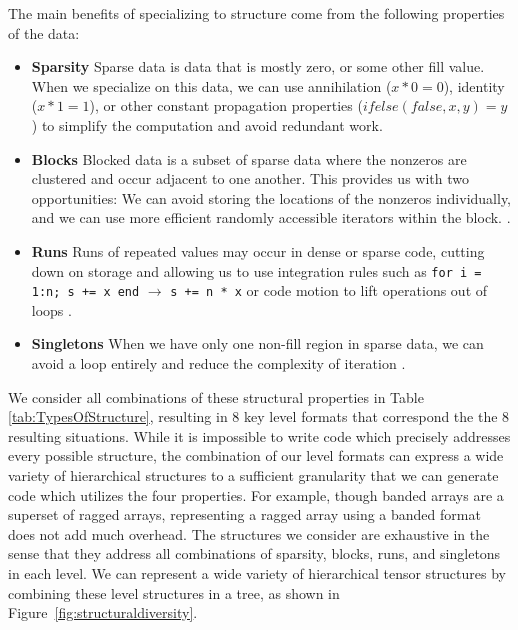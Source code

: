     The main benefits of specializing to structure come from the following properties of the data:
    \begin{itemize}
        \item \textbf{Sparsity} Sparse data is data that is mostly zero, or some other
        fill value. When we specialize on this data, we can use annihilation ($x
        * 0 = 0$), identity ($x * 1 = 1$), or other constant propagation
        properties ($ifelse(false, x, y) = y$) to simplify the computation and avoid
        redundant work.
        
        \item \textbf{Blocks} Blocked data is a subset of sparse data where the nonzeros
        are clustered and occur adjacent to one another. This provides us with
        two opportunities: We can avoid storing the locations of the nonzeros
        individually, and we can use more efficient randomly accessible
        iterators within the block. \cite{im_optimizing_2001, vuduc_performance_2002, ahrens_looplets_2023}.

        \item \textbf{Runs} Runs of repeated values may occur in dense or sparse code,
        cutting down on storage and allowing us to use integration rules such as 
        \texttt{for i = 1:n; s += x end} $\rightarrow$
        \texttt{s += n * x} or code motion to lift operations out of loops \cite{donenfeld_unified_2022,ahrens_looplets_2023}.

        \item \textbf{Singletons} When we have only one non-fill region in sparse data,
        we can avoid a loop entirely and reduce the complexity of iteration \cite{ghorbani2023compiling, ahrens_looplets_2023}.
    \end{itemize}

   We consider all combinations of these structural properties in Table
    \ref{tab:TypesOfStructure}, resulting in 8 key level formats that correspond
    the the 8 resulting situations. While it is impossible to write code which
    precisely addresses every possible structure, the combination of our level
    formats can express a wide variety of hierarchical structures to a
    sufficient granularity that we can generate code which utilizes the four
    properties.  For example, though banded arrays are a superset of ragged
    arrays, representing a ragged array using a banded format does not add much
    overhead.  The structures we consider are exhaustive in the sense that they
    address all combinations of sparsity, blocks, runs, and singletons in each
    level. We can represent a wide variety of hierarchical tensor structures by
    combining these level structures in a tree, as shown in
    Figure~\ref{fig:structuraldiversity}.

